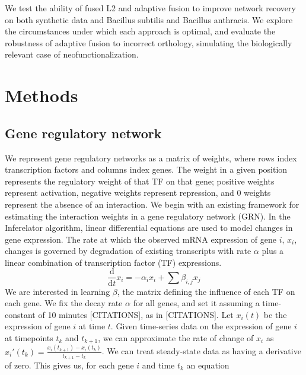 \documentclass[11pt]{article}
\begin{document}
We test the ability of fused L2 and adaptive fusion to improve network recovery on both synthetic data and Bacillus subtilis and Bacillus anthracis. We explore the circumstances under which each approach is optimal, and evaluate the robustness of adaptive fusion to incorrect orthology, simulating the biologically relevant case of neofunctionalization. 

\section{Methods}
\subsection{Gene regulatory network}
We represent gene regulatory networks as a matrix of weights, where rows index transcription factors and columns index genes. The weight in a given position represents the regulatory weight of that TF on that gene; positive weights represent activation, negative weights represent repression, and 0 weights represent the absence of an interaction. We begin with an existing framework for estimating the interaction weights in a gene regulatory network (GRN). In the Inferelator algorithm, linear differential equations are used to model changes in gene expression. The rate at which the observed mRNA expression of gene $i$, $x_i$, changes is governed by degradation of existing transcripts with rate $\alpha$ plus a linear combination of transcription factor (TF) expressions. 
\begin{equation}
\frac{\mathrm d}{\mathrm d t} x_i = -\alpha_{i}x_{i} + \sum \beta_{i,j}x_{j}
\end{equation}
We are interested in learning $\beta$, the matrix defining the influence of each TF on each gene. We fix the decay rate $\alpha$ for all genes, and set it assuming a time-constant of 10 minutes [CITATIONS], as in [CITATIONS]. Let $x_i(t)$ be the expression of gene $i$ at time $t$. Given time-series data on the expression of gene $i$ at timepoints $t_k$ and $t_{k+1}$, we can approximate the rate of change of $x_i$ as $x_i'(t_k)=\frac{x_i(t_{k+1})-x_i(t_k)}{t_{k+1}-t_k}$. We can treat steady-state data as having a derivative of zero. This gives us, for each gene $i$ and time $t_{k}$ an equation
\end{document}
